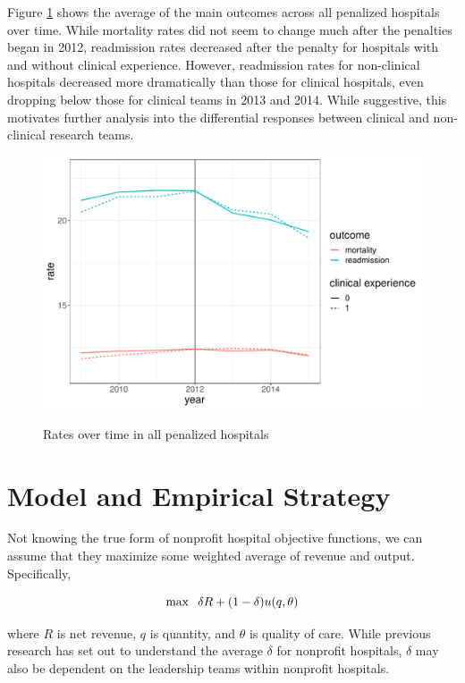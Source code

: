 \documentclass[12pt]{article}
\begin{document}
    Figure \ref{weighted_read_mort_graph} shows the average of the main outcomes across all penalized hospitals over time. While mortality rates did not seem to change much after the penalties began in 2012, readmission rates decreased after the penalty for hospitals with and without clinical experience. However, readmission rates for non-clinical hospitals decreased more dramatically than those for clinical hospitals, even dropping below those for clinical teams in 2013 and 2014. While suggestive, this motivates further analysis into the differential responses between clinical and non-clinical research teams. 

    \begin{figure}[h!]
        \centering
        \caption{Rates over time in all penalized hospitals}
        \includegraphics[scale=.7]{Objects/weighted_read_mort_graph.pdf}
        \label{weighted_read_mort_graph}
    \end{figure}

    \section{Model and Empirical Strategy}

    Not knowing the true form of nonprofit hospital objective functions, we can assume that they maximize some weighted average of revenue and output. Specifically,     
    
    $$\max\hspace{2mm} \delta R + (1-\delta) u(q,\theta)$$

    \noindent where $R$ is net revenue, $q$ is quantity, and $\theta$ is quality of care. While previous research has set out to understand the average $\delta$ for nonprofit hospitals, $\delta$ may also be dependent on the leadership teams within nonprofit hospitals. 
\end{document}
